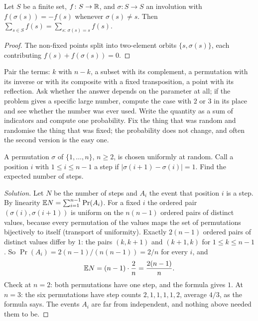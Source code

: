 \begin{lemma}
Let $S$ be a finite set, $f\colon S\to\mathbb{R}$, and $\sigma\colon S\to S$ an involution with $f(\sigma(s))=-f(s)$ whenever $\sigma(s)\neq s$. Then $\sum_{s\in S} f(s)=\sum_{s:\ \sigma(s)=s} f(s)$.
\end{lemma}

\begin{proof}
The non-fixed points split into two-element orbits $\{s,\sigma(s)\}$, each contributing $f(s)+f(\sigma(s))=0$.
\end{proof}

\begin{firstmoves}
Pair the terms: $k$ with $n-k$, a subset with its complement, a permutation with its inverse or with its composite with a fixed transposition, a point with its reflection. Ask whether the answer depends on the parameter at all; if the problem gives a specific large number, compute the case with $2$ or $3$ in its place and see whether the number was ever used. Write the quantity as a sum of indicators and compute one probability. Fix the thing that was random and randomise the thing that was fixed; the probability does not change, and often the second version is the easy one.
\end{firstmoves}

\begin{example}
A permutation $\sigma$ of $\{1,\dots,n\}$, $n\ge 2$, is chosen uniformly at random. Call a position $i$ with $1\le i\le n-1$ a step if $|\sigma(i+1)-\sigma(i)|=1$. Find the expected number of steps.
\end{example}

\begin{proof}[Solution]
Let $N$ be the number of steps and $A_i$ the event that position $i$ is a step. By linearity $\mathbb{E} N=\sum_{i=1}^{n-1}\Pr(A_i)$. For a fixed $i$ the ordered pair $(\sigma(i),\sigma(i+1))$ is uniform on the $n(n-1)$ ordered pairs of distinct values, because every permutation of the values maps the set of permutations bijectively to itself (transport of uniformity). Exactly $2(n-1)$ ordered pairs of distinct values differ by $1$: the pairs $(k,k+1)$ and $(k+1,k)$ for $1\le k\le n-1$. So $\Pr(A_i)=2(n-1)/(n(n-1))=2/n$ for every $i$, and
\[
\mathbb{E} N=(n-1)\cdot\frac{2}{n}=\frac{2(n-1)}{n}.
\]
Check at $n=2$: both permutations have one step, and the formula gives $1$. At $n=3$: the six permutations have step counts $2,1,1,1,1,2$, average $4/3$, as the formula says. The events $A_i$ are far from independent, and nothing above needed them to be.
\end{proof}

